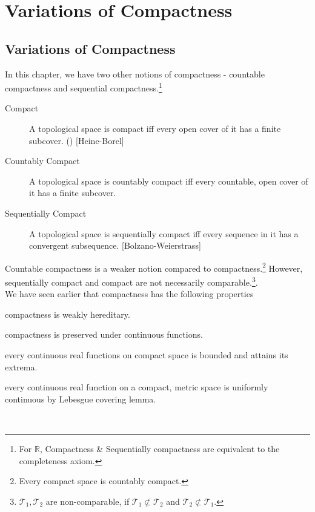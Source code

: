 \section{Variations of Compactness}
\subsection{Variations of Compactness}
	In this chapter, we have two other notions of compactness - countable compactness and sequential compactness.\footnote{For $\mathbb{R}$, Compactness \& Sequentially compactness are equivalent to the completeness axiom.}

	\begin{description}
		\item[Compact] A topological space is compact iff every open cover of it has a finite subcover. (\cite[6.1.1]{joshi}) [Heine-Borel]
		\item[Countably Compact] A topological space is countably compact iff every countable, open cover of it has a finite subcover. \cite[11.1.1]{joshi}
		\item[Sequentially Compact] A topological space is sequentially compact iff every sequence in it has a convergent subsequence. \cite[11.1.8]{joshi} [Bolzano-Weierstrass]
	\end{description}

	Countable compactness is a weaker notion compared to compactness.\footnote{Every compact space is countably compact.} However, sequentially compact and compact are not necessarily comparable.\footnote{$\mathcal{T}_1, \mathcal{T}_2$ are non-comparable, if $\mathcal{T}_1 \not\subset \mathcal{T}_2$ and $\mathcal{T}_2 \not\subset \mathcal{T}_1$.\cite[4.2.1]{joshi}}.\\

	We have seen earlier that compactness has the following properties
\begin{enumerate*}
	\item compactness is weakly hereditary.\cite[6.1.10]{joshi}
	\item compactness is preserved under continuous functions.\cite[6.1.8]{joshi}
	\item every continuous real functions on compact space is bounded and attains its extrema.\cite[6.1.6]{joshi}
	\item every continuous real function on a compact, metric space is uniformly continuous by Lebesgue covering lemma.\cite[6.1.7]{joshi}
\end{enumerate*}\\

